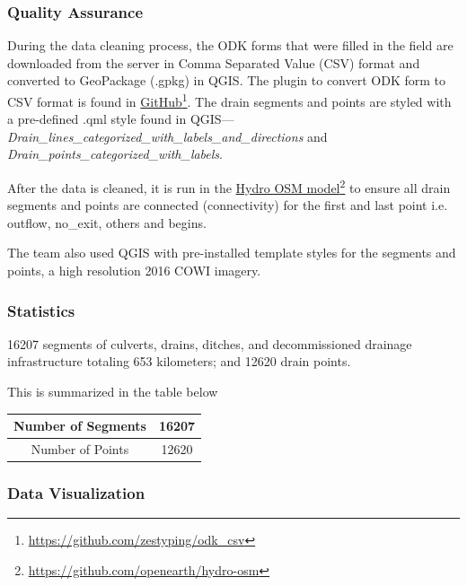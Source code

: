 \documentclass[a4paper,12pt,twoside]{article}
\begin{document}
\subsubsection{Quality Assurance}
During the data cleaning process, the ODK forms that were filled in the field are downloaded from the server in Comma Separated Value (CSV) format and converted to GeoPackage (.gpkg) in QGIS. The plugin to convert ODK form to CSV format is found in \href{https://github.com/zestyping/odk_csv}{GitHub}\footnote{\url{https://github.com/zestyping/odk\_csv}}. The drain segments and points are styled with a pre-defined .qml style found in QGIS---\textit{Drain\_lines\_categorized\_with\_labels\_and\_directions} and \textit{Drain\_points\_categorized\_with\_labels}.

After the data is cleaned, it is run in the \href{https://github.com/openearth/hydro-osm}{Hydro OSM model}\footnote{\url{https://github.com/openearth/hydro-osm}} to ensure all drain segments and points are connected  (connectivity) for the first and last point i.e. outflow, no\_exit, others and begins.

The team also used QGIS with pre-installed template styles for the segments and points, a high resolution 2016 COWI imagery.

\subsubsection{Statistics}
16207 segments of culverts, drains, ditches, and decommissioned drainage infrastructure totaling 653 kilometers; and 12620 drain points.

This is summarized in the table below

\begin{center}
\begin{tabular}{|c|c|}
\hline
   Number of Segments & 16207 \\
\hline
   Number of Points & 12620 \\
   \hline
\end{tabular}
\end{center}

\subsubsection{Data Visualization}
\end{document}
